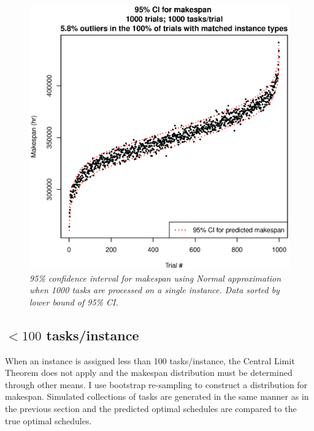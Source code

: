 \documentclass[12pt]{report}
\begin{document}
\begin{figure}
\includegraphics[width=1\textwidth]{validate-stochastic-runtimes-1000-trials-1000-tasks.eps}
\caption{\textit{95\% confidence interval for makespan using Normal approximation when 1000 tasks are processed on a single instance. Data sorted by lower bound of 95\% CI.}}
\label{fig:validate-stochastic-runtimes-1000-trials-1000-tasks}
\end{figure}


\subsection{$< 100$ tasks/instance}

When an instance is assigned less than 100 tasks/instance, the Central Limit Theorem does not apply and the makespan distribution must be determined through other means.
I use bootstrap re-sampling to construct a distribution for makespan.
Simulated collections of tasks are generated in the same manner as in the previous section and the predicted optimal schedules are compared to the true optimal schedules.
\end{document}
